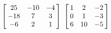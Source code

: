 {$\left[\hskip -3pt \begin{array}{ccc} 25&-10&-4\\  -18&7&3
\\  -6&2&1\end{array}\hskip -3pt \right]$
 }
{$\left[\hskip -3pt \begin{array}{ccc} 1&2&-2\\  0&1&-3
\\  6&10&-5\end{array}\hskip -3pt \right] $}
